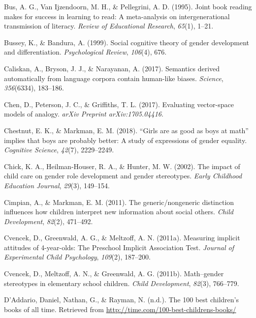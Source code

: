 \documentclass[
  english,
  ,man,floatsintext]{apa6}
\begin{document}
\leavevmode\hypertarget{ref-bus1995joint}{}%
Bus, A. G., Van Ijzendoorn, M. H., \& Pellegrini, A. D. (1995). Joint book reading makes for success in learning to read: A meta-analysis on intergenerational transmission of literacy. \emph{Review of Educational Research}, \emph{65}(1), 1--21.

\leavevmode\hypertarget{ref-bussey1999social}{}%
Bussey, K., \& Bandura, A. (1999). Social cognitive theory of gender development and differentiation. \emph{Psychological Review}, \emph{106}(4), 676.

\leavevmode\hypertarget{ref-caliskan2017semantics}{}%
Caliskan, A., Bryson, J. J., \& Narayanan, A. (2017). Semantics derived automatically from language corpora contain human-like biases. \emph{Science}, \emph{356}(6334), 183--186.

\leavevmode\hypertarget{ref-chen2017evaluating}{}%
Chen, D., Peterson, J. C., \& Griffiths, T. L. (2017). Evaluating vector-space models of analogy. \emph{arXiv Preprint arXiv:1705.04416}.

\leavevmode\hypertarget{ref-chestnut2018girls}{}%
Chestnut, E. K., \& Markman, E. M. (2018). ``Girls are as good as boys at math'' implies that boys are probably better: A study of expressions of gender equality. \emph{Cognitive Science}, \emph{42}(7), 2229--2249.

\leavevmode\hypertarget{ref-chick2002impact}{}%
Chick, K. A., Heilman-Houser, R. A., \& Hunter, M. W. (2002). The impact of child care on gender role development and gender stereotypes. \emph{Early Childhood Education Journal}, \emph{29}(3), 149--154.

\leavevmode\hypertarget{ref-cimpian2011generic}{}%
Cimpian, A., \& Markman, E. M. (2011). The generic/nongeneric distinction influences how children interpret new information about social others. \emph{Child Development}, \emph{82}(2), 471--492.

\leavevmode\hypertarget{ref-cvencek2011measuring}{}%
Cvencek, D., Greenwald, A. G., \& Meltzoff, A. N. (2011a). Measuring implicit attitudes of 4-year-olds: The Preschool Implicit Association Test. \emph{Journal of Experimental Child Psychology}, \emph{109}(2), 187--200.

\leavevmode\hypertarget{ref-cvencek2011math}{}%
Cvencek, D., Meltzoff, A. N., \& Greenwald, A. G. (2011b). Math--gender stereotypes in elementary school children. \emph{Child Development}, \emph{82}(3), 766--779.

\leavevmode\hypertarget{ref-time_100_kidbooks}{}%
D'Addario, Daniel, Nathan, G., \& Rayman, N. (n.d.). The 100 best children's books of all time. Retrieved from \url{http://time.com/100-best-childrens-books/}
\end{document}
